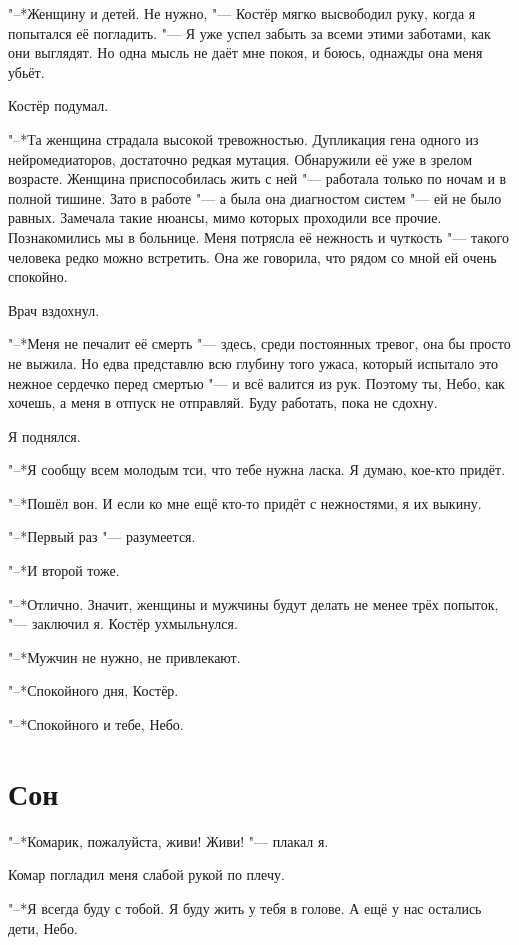 "--*Женщину и детей.
Не нужно, "--- Костёр мягко высвободил руку, когда я попытался её погладить.
"--- Я уже успел забыть за всеми этими заботами, как они выглядят.
Но одна мысль не даёт мне покоя, и боюсь, однажды она меня убьёт.

Костёр подумал.

"--*Та женщина страдала высокой тревожностью.
Дупликация гена одного из нейромедиаторов, достаточно редкая мутация.
Обнаружили её уже в зрелом возрасте.
Женщина приспособилась жить с ней "--- работала только по ночам и в полной тишине.
Зато в работе "--- а была она диагностом систем "--- ей не было равных.
Замечала такие нюансы, мимо которых проходили все прочие.
Познакомились мы в больнице.
Меня потрясла её нежность и чуткость "--- такого человека редко можно встретить.
Она же говорила, что рядом со мной ей очень спокойно.

Врач вздохнул.

"--*Меня не печалит её смерть "--- здесь, среди постоянных тревог, она бы просто не выжила.
Но едва представлю всю глубину того ужаса, который испытало это нежное сердечко перед смертью "--- и всё валится из рук.
Поэтому ты, Небо, как хочешь, а меня в отпуск не отправляй.
Буду работать, пока не сдохну.

Я поднялся.

"--*Я сообщу всем молодым тси, что тебе нужна ласка.
Я думаю, кое-кто придёт.

"--*Пошёл вон.
И если ко мне ещё кто-то придёт с нежностями, я их выкину.

"--*Первый раз "--- разумеется.

"--*И второй тоже.

"--*Отлично.
Значит, женщины и мужчины будут делать не менее трёх попыток, "--- заключил я.
Костёр ухмыльнулся.

"--*Мужчин не нужно, не привлекают.

"--*Спокойного дня, Костёр.

"--*Спокойного и тебе, Небо.

\section{Сон}

"--*Комарик, пожалуйста, живи!
Живи! "--- плакал я.

Комар погладил меня слабой рукой по плечу.

"--*Я всегда буду с тобой.
Я буду жить у тебя в голове.
А ещё у нас остались дети, Небо.

